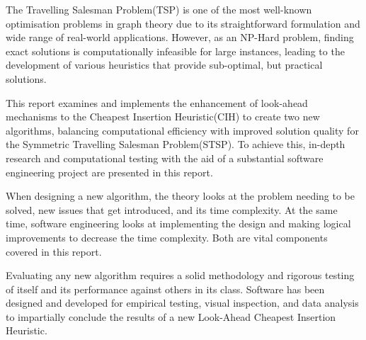 The Travelling Salesman Problem(TSP) is one of the most well-known optimisation problems in graph theory due to its straightforward formulation and wide range of real-world applications. However, as an NP-Hard problem, finding exact solutions is computationally infeasible for large instances, leading to the development of various heuristics that provide sub-optimal, but practical solutions.

This report examines and implements the enhancement of look-ahead mechanisms to the Cheapest Insertion Heuristic(CIH) to create two new algorithms, balancing computational efficiency with improved solution quality for the Symmetric Travelling Salesman Problem(STSP). To achieve this, in-depth research and computational testing with the aid of a substantial software engineering project are presented in this report.

When designing a new algorithm, the theory looks at the problem needing to be solved, new issues that get introduced, and its time complexity. At the same time, software engineering looks at implementing the design and making logical improvements to decrease the time complexity. Both are vital components covered in this report. 

Evaluating any new algorithm requires a solid methodology and rigorous testing of itself and its performance against others in its class. Software has been designed and developed for empirical testing, visual inspection, and data analysis to impartially conclude the results of a new Look-Ahead Cheapest Insertion Heuristic.